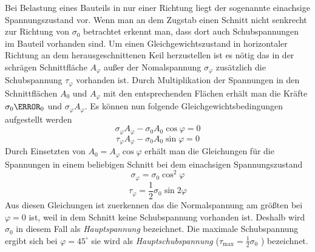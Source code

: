 \documentclass[12pt,a4paper,parskip,twoside,BCOR5mm,headsepline]{scrartcl}
\begin{document}
\begin{description*}
Bei Belastung eines Bauteils in nur einer Richtung liegt der sogenannte einachsige Spannungszustand vor. Wenn man an dem Zugstab  einen Schnitt nicht senkrecht zur Richtung von $ \sigma_0 $ betrachtet erkennt man, dass dort auch Schubspannungen im Bauteil vorhanden sind. Um einen Gleichgewichtszustand in horizontaler Richtung an dem herausgeschnittenen Keil herzustellen ist es nötig das in der schrägen Schnittfläche $ A_{\varphi} $ außer der Nomalspannung $ \sigma_{\varphi} $ zusätzlich die Schubspannung $ \tau_{\varphi} $ vorhanden ist. Durch Multiplikation der Spannungen in den Schnittflächen $ A_0 $ und $ A_{\varphi} $ mit den entsprechenden Flächen erhält man die Kräfte $ \sigma_0 \A_0 $ und $ \sigma_{\varphi} A_{\varphi} $. Es können nun folgende Gleichgewichtsbedingungen aufgestellt werden \begin{equation}
\sigma_{\varphi}A_{\varphi} - \sigma_0 A_0\cos{\varphi} = 0  
\end{equation}
\begin{equation}
\tau_{\varphi}A_{\varphi} - \sigma_0A_0\sin{\varphi} = 0
\end{equation} Durch Einsetzten von $ A_0 = A_{\varphi}\cos{\varphi}$ erhält man die Gleichungen für die Spannungen in einem beliebigen Schnitt bei dem einachsigen Spannungszustand
\begin{equation}
\sigma_{\varphi} = \sigma_0\cos^2{\varphi}
\end{equation}
\begin{equation}
\tau_{\varphi} = \frac{1}{2} \sigma_0\sin{2\varphi}
\end{equation}
Aus diesen Gleichungen ist zuerkennen das die Normalspannung am größten bei $ \varphi = 0 $ ist, weil in dem Schnitt keine Schubspannung vorhanden ist. Deshalb wird $ \sigma_0 $ in diesem Fall als \emph{Hauptspannung} bezeichnet. Die maximale Schubspannung ergibt sich bei $ \varphi = 45^{\circ} $ sie wird als \emph{Hauptschubspannung} ($ \tau_{\text{max}} = \frac{1}{2}\sigma_0 $ ) bezeichnet. \autocite[388]{dd}



  

\end{description*}
\end{document}
